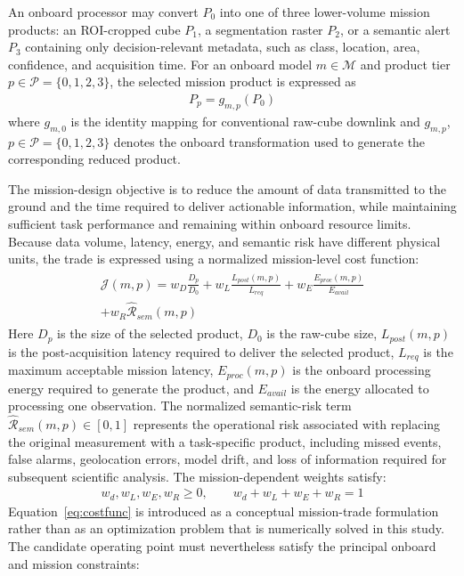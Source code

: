 \documentclass[a4paper,fleqn]{cas-dc}
\begin{document}
An onboard processor may convert \(P_0\) into one of three lower-volume mission products: an ROI-cropped cube \(P_1\), a segmentation raster \(P_2\), or a semantic alert \(P_3\) containing only decision-relevant metadata, such as class, location, area, confidence, and acquisition time. For an onboard model \(m \in \mathcal{M}\) and product tier \(p \in \mathcal{P} = \{0,1,2,3\}\), the selected mission product is expressed as
\begin{eqnarray}
	P_p = g_{m,p}(P_0)
\end{eqnarray}
where \(g_{m,0}\) is the identity mapping for conventional raw-cube downlink and \(g_{m,p}\),  \(p \in \mathcal{P} = \{0,1,2,3\}\) denotes the onboard transformation used to generate the corresponding reduced product.

The mission-design objective is to reduce the amount of data transmitted to the ground and the time required to deliver actionable information, while maintaining sufficient task performance and remaining within onboard resource limits. Because data volume, latency, energy, and semantic risk have different physical units, the trade is expressed using a normalized mission-level cost function:
\begin{eqnarray}\label{eq:costfunc}
	\begin{aligned}
	\mathcal{J}(m,p) = w_D \frac{D_p}{D_0} + w_L \frac{L_{post}(m,p)}{L_{req}} + w_E \frac{E_{proc}(m,p)}{E_{avail}} \\+ w_R \mathcal{\hat{R}}_{sem}(m,p)
	\end{aligned}
\end{eqnarray}
Here \(D_p\) is the size of the selected product, \(D_0\) is the raw-cube size, \(L_{post}(m,p)\) is the post-acquisition latency required to deliver the selected product, \(L_{req}\) is the maximum acceptable mission latency, \(E_{proc}(m,p)\) is the onboard processing energy required to generate the product, and \(E_{avail}\) is the energy allocated to processing one observation. The normalized semantic-risk term \(\mathcal{\hat{R}}_{sem}(m,p) \in [0,1]\) represents the operational risk associated with replacing the original measurement with a task-specific product, including missed events, false alarms, geolocation errors, model drift, and loss of information required for subsequent scientific analysis.
The mission-dependent weights satisfy:
\begin{eqnarray}
	w_d, w_L, w_E, w_R \geq 0, \qquad w_d + w_L+ w_E + w_R =1
\end{eqnarray}
Equation~\ref{eq:costfunc} is introduced as a conceptual mission-trade formulation rather than as an optimization problem that is numerically solved in this study. The candidate operating point must nevertheless satisfy the principal onboard and mission constraints:
\end{document}
